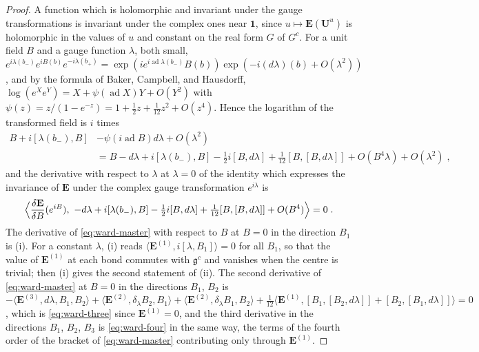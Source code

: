 \documentclass[11pt]{preprint}
\newcommand{\id}{\mathbf 1}
\numberwithin{equation}{section}
\begin{document}
\begin{proof}
A function which is holomorphic and invariant under the gauge transformations is invariant under the complex ones near $\id$, since $u \mapsto \mathbf E(\mathbf U^u)$ is holomorphic in the values of $u$ and constant on the real form $G$ of $G^c$. For a unit field $B$ and a gauge function $\lambda$, both small, $e^{i\lambda(b_-)}e^{iB(b)}e^{-i\lambda(b_+)} = \exp(ie^{i\operatorname{ad}\lambda(b_-)}B(b))\exp(-i(d\lambda)(b) + O(\lambda^2))$, and by the formula of Baker, Campbell, and Hausdorff, $\log(e^Xe^Y) = X + \psi(\operatorname{ad}X)Y + O(Y^2)$ with $\psi(z) = z/(1 - e^{-z}) = 1 + \frac{1}{2}z + \frac{1}{12}z^2 + O(z^4)$. Hence the logarithm of the transformed field is $i$ times
\begin{align*}
    B + i[\lambda(b_-), B] &- \psi(i\operatorname{ad}B)d\lambda + O(\lambda^2)\\
    &= B - d\lambda + i[\lambda(b_-), B] - \tfrac{1}{2}i[B, d\lambda] + \tfrac{1}{12}[B, [B, d\lambda]] + O(B^4\lambda) + O(\lambda^2)\;,
\end{align*}
and the derivative with respect to $\lambda$ at $\lambda = 0$ of the identity which expresses the invariance of $\mathbf E$ under the complex gauge transformation $e^{i\lambda}$ is
\begin{equation}\label{eq:ward-master}
    \Bigl\langle\frac{\delta\mathbf E}{\delta B}(e^{iB}),\ -d\lambda + i[\lambda(b_-), B] - \tfrac{1}{2}i[B, d\lambda] + \tfrac{1}{12}[B, [B, d\lambda]] + O(B^4)\Bigr\rangle = 0\;.
\end{equation}
The derivative of \eqref{eq:ward-master} with respect to $B$ at $B = 0$ in the direction $B_1$ is (i). For a constant $\lambda$, (i) reads $\langle\mathbf E^{(1)}, i[\lambda, B_1]\rangle = 0$ for all $B_1$, so that the value of $\mathbf E^{(1)}$ at each bond commutes with $\mathfrak g^c$ and vanishes when the centre is trivial; then (i) gives the second statement of (ii). The second derivative of \eqref{eq:ward-master} at $B = 0$ in the directions $B_1$, $B_2$ is $-\langle\mathbf E^{(3)}, d\lambda, B_1, B_2\rangle + \langle\mathbf E^{(2)}, \delta_\lambda B_2, B_1\rangle + \langle\mathbf E^{(2)}, \delta_\lambda B_1, B_2\rangle + \frac{1}{12}\langle\mathbf E^{(1)}, [B_1, [B_2, d\lambda]] + [B_2, [B_1, d\lambda]]\rangle = 0$, which is \eqref{eq:ward-three} since $\mathbf E^{(1)} = 0$, and the third derivative in the directions $B_1$, $B_2$, $B_3$ is \eqref{eq:ward-four} in the same way, the terms of the fourth order of the bracket of \eqref{eq:ward-master} contributing only through $\mathbf E^{(1)}$.
\end{proof}
\end{document}
